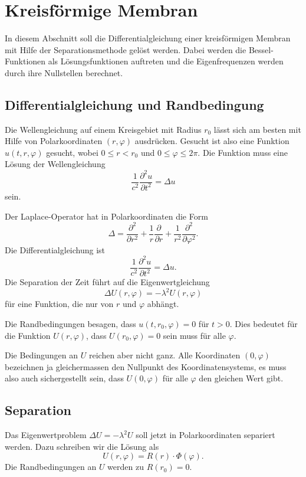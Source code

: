 %
%
%
\section{Kreisförmige Membran
\label{buch:pde:section:kreis}}
In diesem Abschnitt soll die Differentialgleichung einer kreisförmigen
Membran mit Hilfe der Separationsmethode gelöst werden.
Dabei werden die Bessel-Funktionen als Lösungsfunktionen 
auftreten und die Eigenfrequenzen werden durch ihre Nullstellen
berechnet.

\subsection{Differentialgleichung und Randbedingung}
Die Wellengleichung auf einem Kreisgebiet mit Radius $r_0$ 
lässt sich am besten mit Hilfe von Polarkoordinaten $(r,\varphi)$
ausdrücken.
Gesucht ist also eine Funktion $u(t,r,\varphi)$ gesucht, wobei
$0\le r<r_0$ und $0\le \varphi\le 2\pi$.
Die Funktion muss eine Lösung der Wellengleichung
\[
\frac{1}{c^2}\frac{\partial^2u}{\partial t^2} = \Delta u
\]
sein.

Der Laplace-Operator hat in Polarkoordinaten die Form
\begin{equation}
\Delta
=
\frac{\partial^2}{\partial r^2}
+
\frac1r
\frac{\partial}{\partial r}
+
\frac{1}{r^2}
\frac{\partial^2}{\partial\varphi^2}.
\label{buch:pde:kreis:laplace}
\end{equation}
Die Differentialgleichung ist 
\[
\frac{1}{c^2} \frac{\partial^2 u}{\partial t^2}
=
\Delta u.
\]
Die Separation der Zeit führt auf die Eigenwertgleichung
\[
\Delta U(r,\varphi) = -\lambda^2 U(r,\varphi)
\]
für eine Funktion, die nur von $r$ und $\varphi$ abhängt.

Die Randbedingungen besagen, dass $u(t,r_0,\varphi)=0$ für $t>0$.
Dies bedeutet für die Funktion $U(r,\varphi)$, dass
$U(r_0,\varphi)=0$ sein muss für alle $\varphi$.

Die Bedingungen an $U$ reichen aber nicht ganz.
Alle Koordinaten $(0,\varphi)$ bezeichnen ja gleichermassen
den Nullpunkt des Koordinatensystems, es muss also auch sichergestellt
sein, dass $U(0,\varphi)$ für alle $\varphi$ den gleichen Wert gibt.

\subsection{Separation}
Das Eigenwertproblem $\Delta U=-\lambda^2 U$ soll jetzt in Polarkoordinaten
separiert werden.
Dazu schreiben wir die Lösung als
\[
U(r,\varphi)
=
R(r)\cdot \Phi(\varphi).
\]
Die Randbedingungen an $U$ werden zu $R(r_0)=0$.

